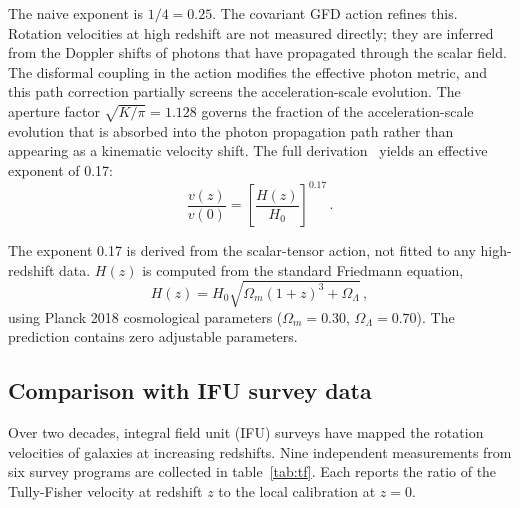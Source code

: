 \documentclass[a4paper,11pt]{article}
\begin{document}
The naive exponent is $1/4 = 0.25$. The covariant GFD action refines this. Rotation velocities at high redshift are not measured directly; they are inferred from the Doppler shifts of photons that have propagated through the scalar field. The disformal coupling in the action modifies the effective photon metric, and this path correction partially screens the acceleration-scale evolution. The aperture factor $\sqrt{K/\pi} = 1.128$ governs the fraction of the acceleration-scale evolution that is absorbed into the photon propagation path rather than appearing as a kinematic velocity shift. The full derivation~\cite{nelson2025a} yields an effective exponent of 0.17:
\begin{equation}
\frac{v(z)}{v(0)} = \left[\frac{H(z)}{H_0}\right]^{0.17}\,.
\label{eq:prediction}
\end{equation}

The exponent 0.17 is derived from the scalar-tensor action, not fitted to any high-redshift data. $H(z)$ is computed from the standard Friedmann equation,
\begin{equation}
H(z) = H_0\sqrt{\Omega_m(1+z)^3 + \Omega_\Lambda}\,,
\label{eq:friedmann}
\end{equation}
using Planck 2018 cosmological parameters ($\Omega_m = 0.30$, $\Omega_\Lambda = 0.70$). The prediction contains zero adjustable parameters.

\subsection{Comparison with IFU survey data}

Over two decades, integral field unit (IFU) surveys have mapped the rotation velocities of galaxies at increasing redshifts. Nine independent measurements from six survey programs are collected in table~\ref{tab:tf}. Each reports the ratio of the Tully-Fisher velocity at redshift $z$ to the local calibration at $z = 0$.
\end{document}
